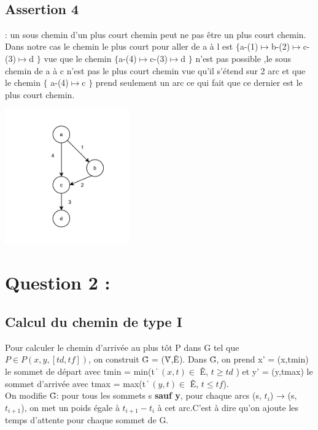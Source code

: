 \documentclass{article}
\begin{document}
\\
\subsection*{Assertion 4 }: un sous chemin d’un plus court chemin peut ne pas être un plus court chemin.
\\Dans notre cas le chemin le plus court pour aller de a à l est $\lbrace$a-(1)$\mapsto$b-(2)$\mapsto$c-(3)$\mapsto$d $\rbrace$ vue que le chemin $\lbrace$a-(4)$\mapsto$c-(3)$\mapsto$d $\rbrace$ n’est pas possible ,le sous chemin de a à c n’est pas le plus court chemin vue qu’il s’étend sur  2 arc et que le chemin $\lbrace$ a-(4)$\mapsto$c $\rbrace$ prend seulement un arc ce qui fait que ce dernier est le plus court chemin.
\\
\begin{center}
\includegraphics[width=0.4\textwidth]{qq.png}
\end{center}
\section*{Question 2 :}

\subsection*{Calcul du chemin de type I}
Pour calculer le chemin d'arrivée au plus tôt P dans G tel que $ P \in P(x, y, [td, tf]) $, on construit  \~G  = (\~V,\~E).
Dans \~G, on prend x' = (x,tmin) le sommet de départ avec tmin = min(t \| $ (x,t) \in $ \~E, $ t \geq td $ ) et y' = (y,tmax) le sommet d'arrivée avec tmax = max(t \| $ (y,t) \in $ \~E, $ t \leq tf $).\\
On modifie \~G: pour tous les sommets s \textbf{sauf y}, pour chaque arcs (s, $ t_{i} $) → (s, $ t_{i+1} $), on met un poids égale à $ t_{i+1} - t_{i} $ à cet arc.C'est à dire qu'on ajoute les temps d'attente pour chaque sommet de G.\\
\end{document}
